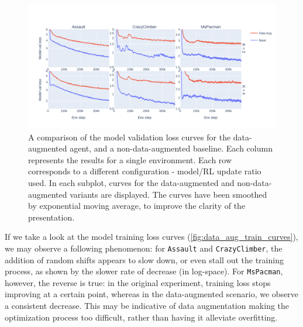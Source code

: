 \documentclass[en]{pracamgr}
\newcommand{\env}[1]{{\tt #1}}
\newcommand{\figurewidth}{\linewidth}
\newcommand{\figureheight}{0.8\paperheight}
\begin{document}
\begin{figure}
  \centering
  \includegraphics[width=\figurewidth,height=\figureheight,keepaspectratio]{assets/data_aug.val_curves.pdf}
  \caption{A comparison of the model validation loss curves for the data-augmented agent, and a non-data-augmented baseline. Each column represents the results for a single environment. Each row corresponds to a different configuration - model/RL update ratio used. In each subplot, curves for the data-augmented and non-data-augmented variants are displayed. The curves have been smoothed by exponential moving average, to improve the clarity of the presentation.}
  \label{fig:data_aug_val_curves}
\end{figure}

If we take a look at the model training loss curves (\autoref{fig:data_aug_train_curves}), we may observe a following phenomenon: for \env{Assault} and \env{CrazyClimber}, the addition of random shifts appears to slow down, or even stall out the training process, as shown by the slower rate of decrease (in log-space). For \env{MsPacman}, however, the reverse is true: in the original experiment, training loss stops improving at a certain point, whereas in the data-augmented scenario, we observe a consistent decrease. This may be indicative of data augmentation making the optimization process too difficult, rather than having it alleviate overfitting.
\end{document}

